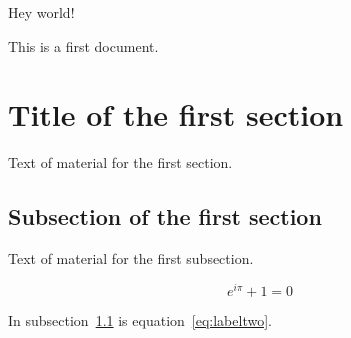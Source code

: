 \documentclass{article}
\begin{document}
Hey world!

This is a first document.

\section{Title of the first section}
Text of material for the first section.

\subsection{Subsection of the first section}
\label{subsec:labelone}
Text of material for the first subsection.

\begin{equation}
e^{i\pi}+1 = 0
\label{eq:labeltwo}
\end{equation}

In subsection~\ref{subsec:labelone} is
equation~\ref{eq:labeltwo}.
\end{document}
